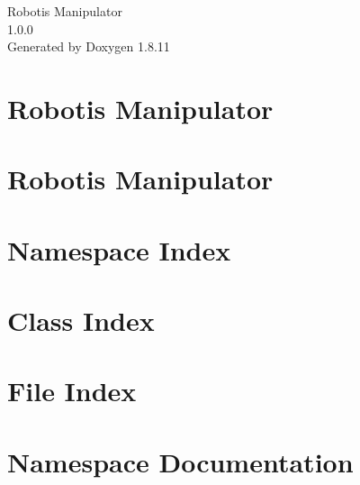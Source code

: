\documentclass[twoside]{book}
\newcommand{\+}{\discretionary{\mbox{\scriptsize$\hookleftarrow$}}{}{}}
\newcommand{\clearemptydoublepage}{%
  \newpage{\pagestyle{empty}\cleardoublepage}%
}
\begin{document}
\hypersetup{pageanchor=false,
             bookmarksnumbered=true,
             pdfencoding=unicode
            }
\begin{titlepage}
\vspace*{7cm}
\begin{center}%
{\Large Robotis Manipulator \\[1ex]\large 1.\+0.\+0 }\\
\vspace*{1cm}
{\large Generated by Doxygen 1.8.11}\\
\end{center}
\end{titlepage}
\clearemptydoublepage
\tableofcontents
\clearemptydoublepage
{}
\hypersetup{pageanchor=true}

\chapter{Robotis Manipulator}
\label{index}\hypertarget{index}{}
\chapter{Robotis Manipulator}
\label{md_README}
\hypertarget{md_README}{}

\chapter{Namespace Index}

\chapter{Class Index}

\chapter{File Index}

\chapter{Namespace Documentation}



\end{document}
